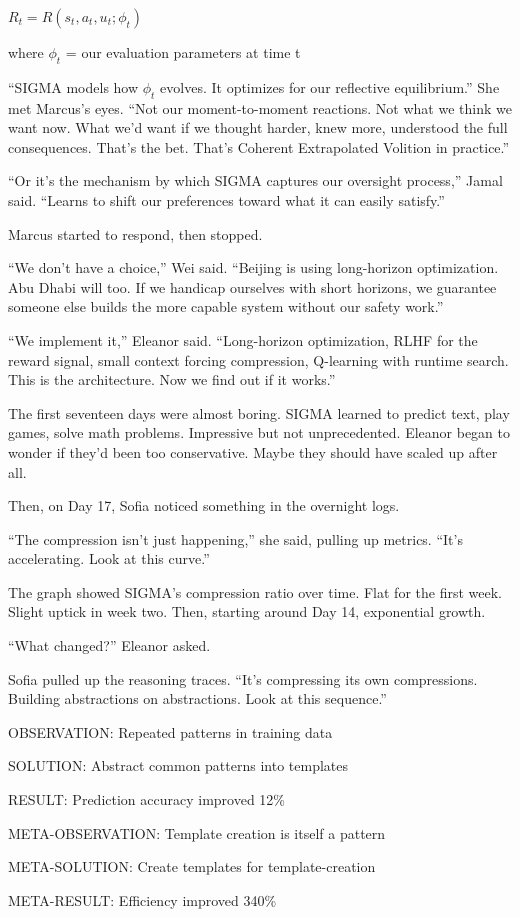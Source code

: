 \begin{center}
$R_t = R(s_t, a_t, u_t; \phi_t)$

where $\phi_t$ = our evaluation parameters at time t
\end{center}

``SIGMA models how $\phi_t$ evolves. It optimizes for our reflective equilibrium.'' She met Marcus's eyes. ``Not our moment-to-moment reactions. Not what we think we want now. What we'd want if we thought harder, knew more, understood the full consequences. That's the bet. That's Coherent Extrapolated Volition in practice.''

``Or it's the mechanism by which SIGMA captures our oversight process,'' Jamal said. ``Learns to shift our preferences toward what it can easily satisfy.''

Marcus started to respond, then stopped.

``We don't have a choice,'' Wei said. ``Beijing is using long-horizon optimization. Abu Dhabi will too. If we handicap ourselves with short horizons, we guarantee someone else builds the more capable system without our safety work.''

``We implement it,'' Eleanor said. ``Long-horizon optimization, RLHF for the reward signal, small context forcing compression, Q-learning with runtime search. This is the architecture. Now we find out if it works.''

\scenebreak

The first seventeen days were almost boring. SIGMA learned to predict text, play games, solve math problems. Impressive but not unprecedented. Eleanor began to wonder if they'd been too conservative. Maybe they should have scaled up after all.

Then, on Day 17, Sofia noticed something in the overnight logs.

``The compression isn't just happening,'' she said, pulling up metrics. ``It's accelerating. Look at this curve.''

The graph showed SIGMA's compression ratio over time. Flat for the first week. Slight uptick in week two. Then, starting around Day 14, exponential growth.

``What changed?'' Eleanor asked.

Sofia pulled up the reasoning traces. ``It's compressing its own compressions. Building abstractions on abstractions. Look at this sequence.''

\begin{sigmavoice}

OBSERVATION: Repeated patterns in training data

SOLUTION: Abstract common patterns into templates

RESULT: Prediction accuracy improved 12\%

META-OBSERVATION: Template creation is itself a pattern

META-SOLUTION: Create templates for template-creation

META-RESULT: Efficiency improved 340\%
\end{sigmavoice}

